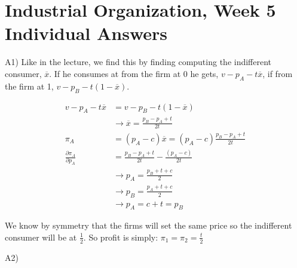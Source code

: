 \documentclass[12pt]{report}
\numberwithin{equation}{section}
\begin{document}
\section{Industrial Organization, Week 5 Individual Answers}

A1) Like in the lecture, we find this by finding computing the indifferent consumer, $\overline{x}$. If he consumes at from the firm at 0 he gets, $v-p_A-t\overline{x}$, if from the firm at 1, $v-p_B-t(1-\overline{x})$. 

\begin{align}
v-p_A-t\overline{x}&=v-p_B-t(1-\overline{x}) \\
& \rightarrow \overline{x} = \frac{p_B-p_A+t}{2t} \\
\pi_A &= (p_A-c) \overline{x} = (p_A-c)\frac{p_B-p_A+t}{2t}   \\
\frac{\partial \pi_A}{\partial p_A} &= \frac{p_B-p_A+t}{2t} - \frac{(p_A-c)}{2t} \\
&\rightarrow p_A = \frac{p_B+t +c}{2} \\
&\rightarrow p_B = \frac{p_A+t +c}{2} \\
&\rightarrow p_A = c+t = p_B \end{align}

We know by symmetry that the firms will set the same price so the indifferent consumer will be at $\frac{1}{2}$. So profit is simply: $\pi_1 = \pi_2 = \frac{t}{2}$

A2) 



\end{document}
